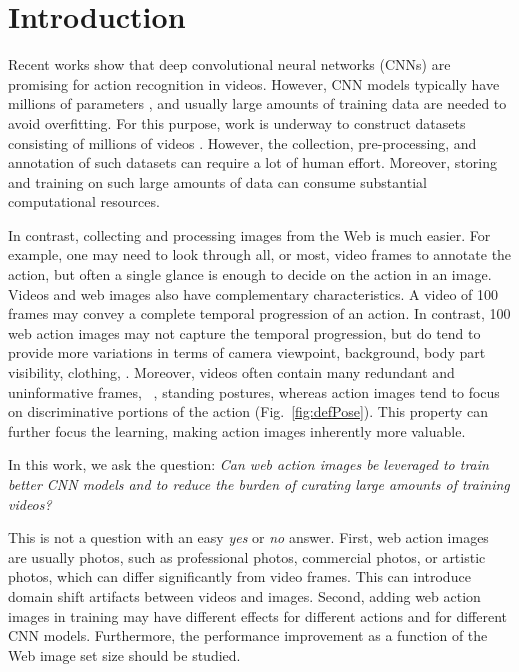 \documentclass[10pt,twocolumn,letterpaper]{article}
\begin{document}
\section{Introduction}



Recent works \cite{KarpathyTSLSF14, simonyan2014two} show that deep convolutional neural networks (CNNs) are promising for action recognition in videos. However, CNN models typically have millions of parameters \cite{chatfield2014return, krizhevsky2012imagenet, simonyan2014very}, and usually large amounts of training data are needed to avoid overfitting. For this purpose, work is underway to construct datasets consisting of millions of videos \cite{KarpathyTSLSF14}. However, the collection, pre-processing, and annotation of such datasets can require a lot of human effort. Moreover, storing and training on such large amounts of data can consume substantial computational resources.  

In contrast, collecting and processing images from the Web is much easier. For example, one may need to look through all, or most, video frames to annotate the action, but often a single glance is enough to decide on the action in an image. Videos and web images also have complementary characteristics.
A video of 100 frames may convey a complete temporal progression of an action.
In contrast, 100 web action images may not capture the temporal progression, but do tend to provide more variations in terms of camera viewpoint, background, body part visibility, clothing, \etc. Moreover, videos often contain many redundant and uninformative frames, \eg~, standing postures, whereas action images tend to focus on discriminative portions of the action (Fig.~\ref{fig:defPose}). This property can further focus the learning, making action images inherently more valuable.

In this work, we ask the question: {\em Can web action images be leveraged to train better CNN models and to reduce the burden of curating large amounts of training videos?}  

This is not a question with an easy {\em yes} or {\em no} answer. First, web action images are usually photos, such as professional photos, commercial photos, or artistic photos, which can differ significantly from video frames. This can introduce domain shift artifacts between videos and images. Second, adding web action images in training may have different effects for different actions and for different CNN models. Furthermore, the performance improvement as a function of the Web image set size should be studied.
   
\end{document}
